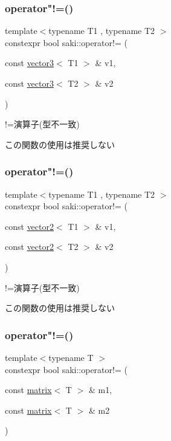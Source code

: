 \subsubsection{\texorpdfstring{operator"!=()}{operator!=()}\hspace{0.1cm}{\footnotesize\ttfamily [8/11]}}
{\footnotesize\ttfamily template$<$typename T1 , typename T2 $>$ \\
constexpr bool saki\+::operator!= (\begin{DoxyParamCaption}\item[{const \mbox{\hyperlink{classsaki_1_1vector3}{vector3}}$<$ T1 $>$ \&}]{v1,  }\item[{const \mbox{\hyperlink{classsaki_1_1vector3}{vector3}}$<$ T2 $>$ \&}]{v2 }\end{DoxyParamCaption})}



!=演算子(型不一致) 

この関数の使用は推奨しない \mbox{\label{namespacesaki_a0d7159e145464e2deab2de2a76be1c00}} 
\subsubsection{\texorpdfstring{operator"!=()}{operator!=()}\hspace{0.1cm}{\footnotesize\ttfamily [9/11]}}
{\footnotesize\ttfamily template$<$typename T1 , typename T2 $>$ \\
constexpr bool saki\+::operator!= (\begin{DoxyParamCaption}\item[{const \mbox{\hyperlink{classsaki_1_1vector2}{vector2}}$<$ T1 $>$ \&}]{v1,  }\item[{const \mbox{\hyperlink{classsaki_1_1vector2}{vector2}}$<$ T2 $>$ \&}]{v2 }\end{DoxyParamCaption})}



!=演算子(型不一致) 

この関数の使用は推奨しない \mbox{\label{namespacesaki_a76722addb100e11d9eb9370ced3b027c}} 
\subsubsection{\texorpdfstring{operator"!=()}{operator!=()}\hspace{0.1cm}{\footnotesize\ttfamily [10/11]}}
{\footnotesize\ttfamily template$<$typename T $>$ \\
constexpr bool saki\+::operator!= (\begin{DoxyParamCaption}\item[{const \mbox{\hyperlink{classsaki_1_1matrix}{matrix}}$<$ T $>$ \&}]{m1,  }\item[{const \mbox{\hyperlink{classsaki_1_1matrix}{matrix}}$<$ T $>$ \&}]{m2 }\end{DoxyParamCaption})}




